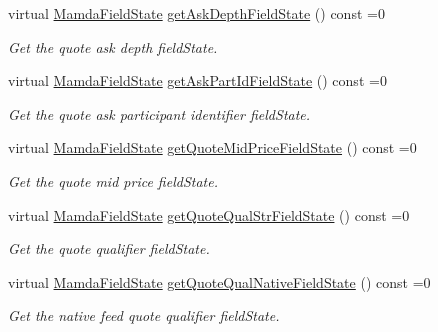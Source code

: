 \begin{CompactItemize}
virtual \hyperlink{namespaceWombat_93aac974f2ab713554fd12a1fa3b7d2a}{Mamda\-Field\-State} \hyperlink{classWombat_1_1MamdaQuoteRecap_53dd0bc6a2a9ceb6612b2438cc2e9272}{get\-Ask\-Depth\-Field\-State} () const =0
\begin{CompactList}\small\item\em Get the quote ask depth field\-State. \item\end{CompactList}\item 
virtual \hyperlink{namespaceWombat_93aac974f2ab713554fd12a1fa3b7d2a}{Mamda\-Field\-State} \hyperlink{classWombat_1_1MamdaQuoteRecap_3e92b5b825c4ca2701857aee43c1e1e7}{get\-Ask\-Part\-Id\-Field\-State} () const =0
\begin{CompactList}\small\item\em Get the quote ask participant identifier field\-State. \item\end{CompactList}\item 
virtual \hyperlink{namespaceWombat_93aac974f2ab713554fd12a1fa3b7d2a}{Mamda\-Field\-State} \hyperlink{classWombat_1_1MamdaQuoteRecap_5e38936a65a09122e1f1d49619d4a674}{get\-Quote\-Mid\-Price\-Field\-State} () const =0
\begin{CompactList}\small\item\em Get the quote mid price field\-State. \item\end{CompactList}\item 
virtual \hyperlink{namespaceWombat_93aac974f2ab713554fd12a1fa3b7d2a}{Mamda\-Field\-State} \hyperlink{classWombat_1_1MamdaQuoteRecap_8dfd4b3dcd940b04e628a741e3dbfb06}{get\-Quote\-Qual\-Str\-Field\-State} () const =0
\begin{CompactList}\small\item\em Get the quote qualifier field\-State. \item\end{CompactList}\item 
virtual \hyperlink{namespaceWombat_93aac974f2ab713554fd12a1fa3b7d2a}{Mamda\-Field\-State} \hyperlink{classWombat_1_1MamdaQuoteRecap_1d5b1c7bd433ee7e444e83ec39c2de62}{get\-Quote\-Qual\-Native\-Field\-State} () const =0
\begin{CompactList}\small\item\em Get the native feed quote qualifier field\-State. \item\end{CompactList}\item 

\end{CompactItemize}
